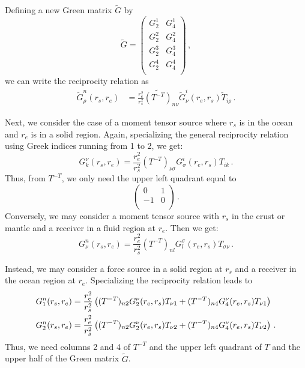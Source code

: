 \documentclass[11pt,a4paper]{article}
\begin{document}
Defining a new Green matrix $\tilde{G}$ by
\begin{equation}
\tilde{G} = \left(\begin{array}{cc}
G_2^1 & G_4^1 \\
G_2^2 & G_4^2 \\
G_2^3 & G_4^3 \\
G_2^4 & G_4^4 \\
\end{array}\right) \,,
\end{equation}
we can write the reciprocity relation as
\begin{align}
\tilde{G}_\rho^n(r_s,r_e) &= \frac{r_e^2}{r_s^2}\tilde{(T^{-T})}_{n\nu} \tilde{G}_\nu^i(r_e,r_s) \tilde{T}_{i\rho} \,.
\end{align}

Next, we consider the case of a moment tensor source where $r_s$ is in the ocean and $r_e$ is in a solid region. Again, specializing the general
reciprocity relation using Greek indices running from 1 to 2, we get:
\begin{equation}
G_k^\nu(r_s,r_e) = \frac{r_e^2}{r_s^2} (T^{-T})_{\nu\sigma} G_\sigma^i(r_e,r_s) T_{ik}\,.
\end{equation}
Thus, from $T^{-T}$, we only need the upper left quadrant equal to
\begin{equation}
\left(\begin{array}{cc}
0 & 1  \\
-1 & 0 \\
\end{array}\right) \,.
\end{equation}
Conversely, we may consider a moment tensor source with $r_s$ in the crust or mantle and a receiver in a fluid region at $r_e$. Then we get:
\begin{equation}
G_\nu^n(r_s,r_e) = \frac{r_e^2}{r_s^2} (T^{-T})_{nl} G_l^\sigma(r_e,r_s) T_{\sigma \nu}\,.
\end{equation}

Instead, we may consider a force source in a solid region at $r_s$ and a receiver in the ocean region at $r_e$. Specializing the reciprocity relation
leads to
\begin{align}
G_1^n(r_s,r_e) &= \frac{r_e^2}{r_s^2}\left( (T^{-T})_{n2} G_2^\nu(r_e,r_s) T_{\nu 1} + (T^{-T})_{n4} G_4^\nu(r_e,r_s) T_{\nu 1} \right) \notag\\
G_2^n(r_s,r_e) &= \frac{r_e^2}{r_s^2}\left( (T^{-T})_{n2} G_2^\nu(r_e,r_s) T_{\nu 2} + (T^{-T})_{n4} G_4^\nu(r_e,r_s) T_{\nu 2} \right) \,.
\end{align}
Thus, we need columns 2 and 4 of $T^{-T}$ and the upper left quadrant of $T$ and the upper half of the Green matrix $\tilde{G}$.
\end{document}
